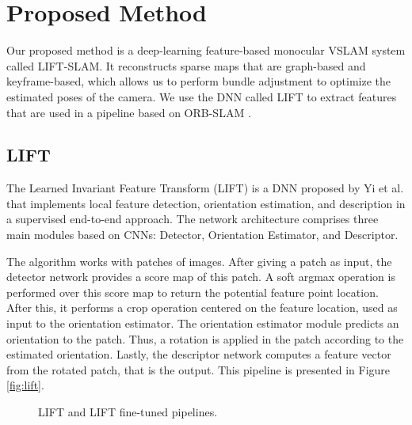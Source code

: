 \section{Proposed Method}
\label{sec:method}

Our proposed method is a deep-learning feature-based monocular VSLAM system called LIFT-SLAM. It reconstructs sparse maps that are graph-based and keyframe-based, which allows us to perform bundle adjustment to optimize the estimated poses of the camera. We use the DNN called LIFT \cite{lift} to extract features that are used in a pipeline based on ORB-SLAM \cite{orb-slam}. 

\subsection{LIFT}
\label{sec:lift}
The Learned Invariant Feature Transform (LIFT) is a DNN proposed by Yi et al. \cite{lift} that implements local feature detection, orientation estimation, and description in a supervised end-to-end approach. The network architecture comprises three main modules based on CNNs: Detector, Orientation Estimator, and Descriptor.

The algorithm works with patches of images. After giving a patch as input, the detector network provides a score map of this patch. A soft argmax operation \cite{softargmax} is performed over this score map to return the potential feature point location. After this, it performs a crop operation centered on the feature location, used as input to the orientation estimator. The orientation estimator module predicts an orientation to the patch. Thus, a rotation is applied in the patch according to the estimated orientation. Lastly, the descriptor network computes a feature vector from the rotated patch, that is the output. This pipeline is presented in Figure \ref{fig:lift}.

\begin{figure}
\centering
{}


\caption{LIFT and LIFT fine-tuned pipelines.}
\label{fig:lift-pipelines}
\end{figure}


